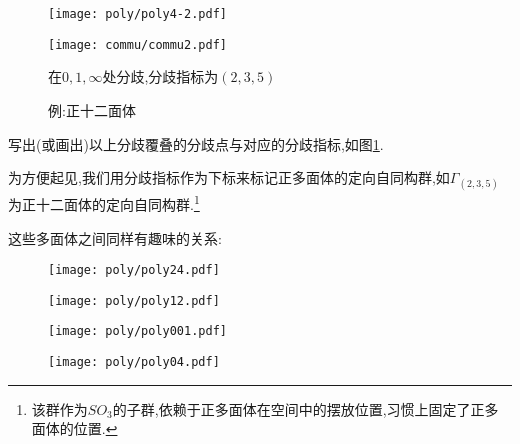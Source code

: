 \begin{enumerate}
\begin{figure}[ht]
	\begin{minipage}[t]{.34\textwidth}
		\vspace{0.1cm}
		\centering
		\texttt{[image: poly/poly4-2.pdf]}
		
	\end{minipage}
	\begin{minipage}[t]{.64\textwidth}
		\vspace{0.1cm}
		\centering
		\texttt{[image: commu/commu2.pdf]}
		\caption*{在$0,1,\infty$处分歧,分歧指标为$(2,3,5)$}
	\end{minipage}
	\caption{例:正十二面体}
	\label{pic:comm2}
\end{figure}

\begin{exercise}
	写出(或画出)以上分歧覆叠的分歧点与对应的分歧指标,如图\ref{pic:comm2}.
\end{exercise}

为方便起见,我们用分歧指标作为下标来标记正多面体的定向自同构群,如$\Gamma_{(2,3,5)}$为正十二面体的定向自同构群.\footnote{该群作为$SO_3$的子群,依赖于正多面体在空间中的摆放位置,习惯上固定了正多面体的位置.}
\end{enumerate}


这些多面体之间同样有趣味的关系:
\begin{figure}[ht]
		\begin{minipage}[t]{.28\textwidth}
		\centering
		\texttt{[image: poly/poly24.pdf]}
		\caption{}
		\label{eg:fig1}
	\end{minipage}
	\begin{minipage}[t]{.22\textwidth}
		\centering
		\texttt{[image: poly/poly12.pdf]}
		\caption{}
		\label{eg:fig2}
	\end{minipage}
	\begin{minipage}[t]{.22\textwidth}
		\centering
		\texttt{[image: poly/poly001.pdf]}
		\caption{}
		\label{eg:fig3}
	\end{minipage}
	\begin{minipage}[t]{.22\textwidth}
		\centering
		\texttt{[image: poly/poly04.pdf]}
		\caption{}
		\label{eg:fig4}
	\end{minipage}
\end{figure}

